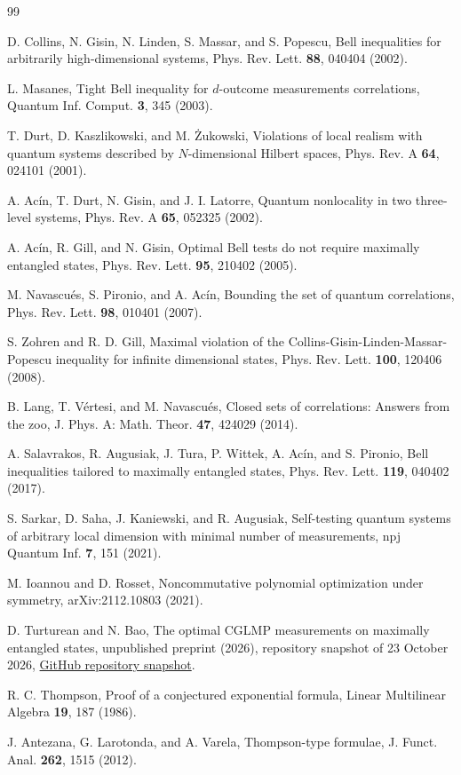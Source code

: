 \documentclass[aps,prl,reprint,superscriptaddress,nofootinbib]{revtex4-2}
\begin{document}
\begin{thebibliography}{99}

D. Collins, N. Gisin, N. Linden, S. Massar, and S. Popescu,
Bell inequalities for arbitrarily high-dimensional systems,
Phys. Rev. Lett. \textbf{88}, 040404 (2002).

L. Masanes,
Tight Bell inequality for $d$-outcome measurements correlations,
Quantum Inf. Comput. \textbf{3}, 345 (2003).

T. Durt, D. Kaszlikowski, and M. \ifmmode{}\else\.Z\fi{}ukowski,
Violations of local realism with quantum systems described by $N$-dimensional Hilbert spaces,
Phys. Rev. A \textbf{64}, 024101 (2001).

A. Ac\'{i}n, T. Durt, N. Gisin, and J. I. Latorre,
Quantum nonlocality in two three-level systems,
Phys. Rev. A \textbf{65}, 052325 (2002).

A. Ac\'{i}n, R. Gill, and N. Gisin,
Optimal Bell tests do not require maximally entangled states,
Phys. Rev. Lett. \textbf{95}, 210402 (2005).

M. Navascu\'{e}s, S. Pironio, and A. Ac\'{i}n,
Bounding the set of quantum correlations,
Phys. Rev. Lett. \textbf{98}, 010401 (2007).

S. Zohren and R. D. Gill,
Maximal violation of the Collins-Gisin-Linden-Massar-Popescu inequality for infinite dimensional states,
Phys. Rev. Lett. \textbf{100}, 120406 (2008).

B. Lang, T. V\'{e}rtesi, and M. Navascu\'{e}s,
Closed sets of correlations: Answers from the zoo,
J. Phys. A: Math. Theor. \textbf{47}, 424029 (2014).

A. Salavrakos, R. Augusiak, J. Tura, P. Wittek, A. Ac\'{i}n, and S. Pironio,
Bell inequalities tailored to maximally entangled states,
Phys. Rev. Lett. \textbf{119}, 040402 (2017).

S. Sarkar, D. Saha, J. Kaniewski, and R. Augusiak,
Self-testing quantum systems of arbitrary local dimension with minimal number of measurements,
npj Quantum Inf. \textbf{7}, 151 (2021).

M. Ioannou and D. Rosset,
Noncommutative polynomial optimization under symmetry,
arXiv:2112.10803 (2021).

D. Turturean and N. Bao,
The optimal CGLMP measurements on maximally entangled states,
unpublished preprint (2026), repository snapshot of 23 October 2026,
\href{https://github.com/physical-superintelligence/oqp-batch-2026/blob/7049357c42a8fe85262da08fdc10d57b4d9e67a0/oqp27-cglmp-inequalities/paper/oqp27-cglmp-inequalities.pdf}{GitHub repository snapshot}.

R. C. Thompson,
Proof of a conjectured exponential formula,
Linear Multilinear Algebra \textbf{19}, 187 (1986).

J. Antezana, G. Larotonda, and A. Varela,
Thompson-type formulae,
J. Funct. Anal. \textbf{262}, 1515 (2012).

\end{thebibliography}
\end{document}
